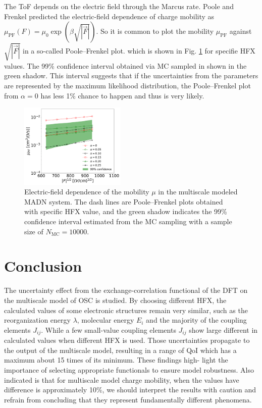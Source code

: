 \documentclass[%
 reprint,
 amsmath,amssymb,
 aps,
]{revtex4-2}
\begin{document}
The ToF depends on the electric field through the Marcus rate. 
Poole and Frenkel predicted the electric-field dependence of charge mobility as $\mu_\text{PF}(F)=\mu_0 \exp (\beta \sqrt{|\vec{F}|})$.
So it is common to plot the mobility $\mu_\text{PF}$ against $\sqrt{|\vec{F}|}$ in a so-called Poole–Frenkel plot.
which is shown in Fig. \ref{fig:PF_plot_ave} for specifie HFX values. The 99\% confidence interval obtained via MC sampled in shown in the green shadow. 
This interval suggests that if the uncertainties from the parameters are represented by the maximum likelihood distribution, the Poole–Frenkel plot from $\alpha=0$ has less 1\% chance to happen and thus is very likely. 
%
\begin{figure}[tbp]
    \centering
    \includegraphics[width=0.45\textwidth]{figs/fig_PF_plot_ave.pdf}
    \caption{Electric-field dependence of the mobility $\mu$ in the multiscale modeled MADN system. The dash lines are Poole–Frenkel plots obtained with specific HFX value, and the green shadow indicates the 99\% confidence interval estimated from the MC sampling with a sample size of $N_\text{MC}=10000$.}
    \label{fig:PF_plot_ave}
\end{figure}
\section{Conclusion}
The uncertainty effect from the exchange-correlation functional of the DFT on the multiscale model of OSC is studied. By choosing different HFX, the calculated values of some electronic structures remain very similar,
such as the reorganization energy $\lambda$, molecular energy $E_i$ and the majority of the coupling elements  $J_{ij}$. While a few small-value coupling elements $J_{ij}$ show large different in calculated values when different HFX is used. Those uncertainties propagate to the output of the multiscale model, resulting in a range of QoI which has a maximum about 15 times of its minimum. These findings high-
light the importance of selecting appropriate functionals to ensure model robustness. Also indicated is that for multiscale model charge mobility, when the values have difference is approximately 10\%, we should interpret the results with caution and refrain from concluding that they represent fundamentally different phenomena.
\end{document}

